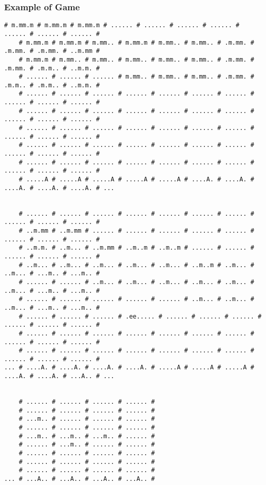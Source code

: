\documentclass[a4paper]{article}
\begin{document}
\subsubsection{Example of Game}
\begin{Verbatim}[fontsize=\footnotesize]
    # m.mm.m # m.mm.m # m.mm.m # ...... # ...... # ...... # ...... # ...... # ...... # ...... #
    # m.mm.m # m.mm.m # m.mm.. # m.mm.m # m.mm.. # m.mm.. # .m.mm. # .m.mm. # .m.mm. # ..m.mm #
    # m.mm.m # m.mm.. # m.mm.. # m.mm.. # m.mm.. # m.mm.. # .m.mm. # .m.mm. # .m.m.. # ..m.m. #
    # ...... # ...... # ...... # m.mm.. # m.mm.. # m.mm.. # .m.mm. # .m.m.. # .m.m.. # ..m.m. #
    # ...... # ...... # ...... # ...... # ...... # ...... # ...... # ...... # ...... # ...... #
    # ...... # ...... # ...... # ...... # ...... # ...... # ...... # ...... # ...... # ...... #
    # ...... # ...... # ...... # ...... # ...... # ...... # ...... # ...... # ...... # ...... #
    # ...... # ...... # ...... # ...... # ...... # ...... # ...... # ...... # ...... # ...... #
    # ...... # ...... # ...... # ...... # ...... # ...... # ...... # ...... # ...... # ...... #
    # .....A # .....A # .....A # .....A # .....A # ....A. # ....A. # ....A. # ....A. # ....A. # ...


    # ...... # ...... # ...... # ...... # ...... # ...... # ...... # ...... # ...... # ...... #
    # ..m.mm # ..m.mm # ...... # ...... # ...... # ...... # ...... # ...... # ...... # ...... #
    # ..m.m. # ..m... # ..m.mm # ..m..m # ..m..m # ...... # ...... # ...... # ...... # ...... #
    # ..m... # ..m... # ..m... # ..m... # ..m... # ..m..m # ..m... # ..m... # ...m.. # ...m.. #
    # ...... # ...... # ..m... # ..m... # ..m... # ..m... # ..m... # ..m... # ...m.. # ...m.. #
    # ...... # ...... # ...... # ...... # ...... # ..m... # ..m... # ..m... # ...m.. # ...m.. #
    # ...... # ...... # ...... # .ee..... # ...... # ...... # ...... # ...... # ...... # ...... #
    # ...... # ...... # ...... # ...... # ...... # ...... # ...... # ...... # ...... # ...... #
    # ...... # ...... # ...... # ...... # ...... # ...... # ...... # ...... # ...... # ...... #
... # ....A. # ....A. # ....A. # ....A. # .....A # .....A # .....A # ....A. # ....A. # ...A.. # ...


    # ...... # ...... # ...... # ...... #
    # ...... # ...... # ...... # ...... #
    # ...m.. # ...... # ...... # ...... #
    # ...... # ...... # ...... # ...... #
    # ...m.. # ...m.. # ...m.. # ...... #
    # ...... # ...m.. # ...... # ...... #
    # ...... # ...... # ...... # ...... #
    # ...... # ...... # ...... # ...... #
    # ...... # ...... # ...... # ...... #
... # ...A.. # ...A.. # ...A.. # ...A.. #
\end{Verbatim}
\end{document}
